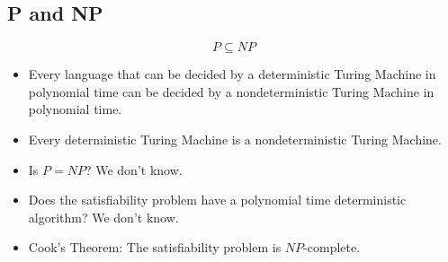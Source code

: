 \documentclass[a4paper]{article}
\begin{document}
\begin{multicols}{2}
	\section{P and NP}
	$$P \subseteq NP$$
	\begin{itemize}
		\item Every language that can be decided by a deterministic Turing
					Machine in polynomial time can be decided by a nondeterministic
					Turing Machine in polynomial time.
		\item Every deterministic Turing Machine is a nondeterministic Turing
					Machine.
		\item Is $P = NP$? We don't know.
		\item Does the satisfiability problem have a polynomial time deterministic
					algorithm? We don't know.
		\item Cook's Theorem: The satisfiability problem is $NP$-complete.
	\end{itemize}

\end{multicols}
\end{document}
